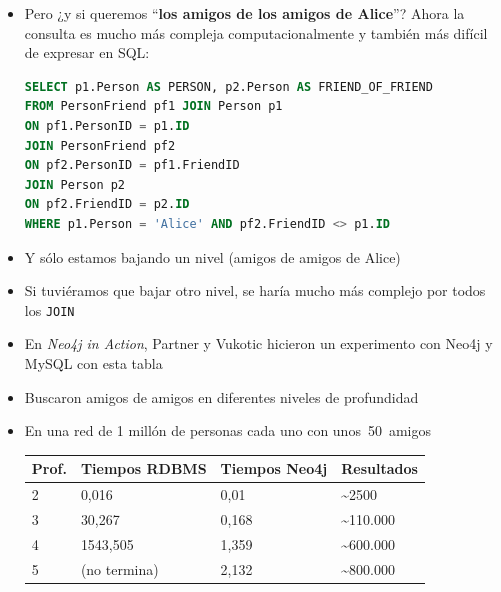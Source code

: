 \documentclass[14pt]{beamer}
\begin{document}
\begin{frame}
\begin{itemize}
\begin{frame}
\begin{itemize}
\item Pero ¿y si queremos ``{\bf los amigos de los amigos de Alice}''?
  Ahora la consulta es mucho más compleja computacionalmente y también más
  difícil de expresar en SQL:

\begin{lstlisting}[language=SQL]
SELECT p1.Person AS PERSON, p2.Person AS FRIEND_OF_FRIEND
FROM PersonFriend pf1 JOIN Person p1
ON pf1.PersonID = p1.ID
JOIN PersonFriend pf2
ON pf2.PersonID = pf1.FriendID
JOIN Person p2
ON pf2.FriendID = p2.ID
WHERE p1.Person = 'Alice' AND pf2.FriendID <> p1.ID
\end{lstlisting}

\item Y sólo estamos bajando un nivel (amigos de amigos de Alice)
\item Si tuviéramos que bajar otro nivel, se haría mucho más complejo por
  todos los {\tt JOIN}

\item En {\em Neo4j in Action\/}, Partner y Vukotic hicieron un experimento
  con Neo4j y MySQL con esta tabla
\item Buscaron amigos de amigos en diferentes niveles de profundidad
\item En una red de 1 millón de personas cada uno con unos~50~amigos

  \begin{small}
    \begin{tabular}{llll}
      \toprule
      Prof.& Tiempos RDBMS & Tiempos Neo4j & Resultados\\
      \midrule
      2&0,016&0,01&\~{}2500\\
      3&30,267&0,168&\~{}110.000\\
      4&1543,505&1,359&\~{}600.000\\
      5&(no termina)&2,132&\~{}800.000\\
      \bottomrule
    \end{tabular}
  \end{small}
\end{itemize}


\end{frame}
\end{itemize}
\end{frame}
\end{document}
